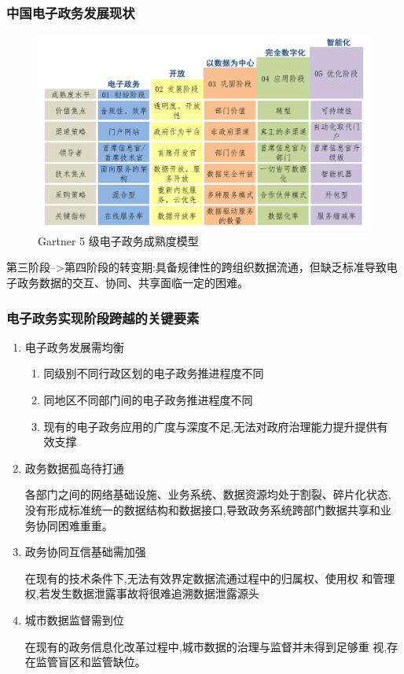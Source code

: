 \documentclass[11pt]{beamer}
\begin{document}
\begin{frame}
	\frametitle{{中国电子政务发展现状}}
	\begin{figure}
		\centering
		\includegraphics[width=0.75\linewidth]{figures/gov/3}
		\caption{Gartner 5 级电子政务成熟度模型}
		\label{fig:3}
	\end{figure}
	{\footnotesize 第三阶段-->第四阶段的转变期:具备规律性的跨组织数据流通，但缺乏标准导致电子政务数据的交互、协同、共享面临一定的困难。}
\end{frame}

\begin{frame}
	\frametitle{{电子政务实现阶段跨越的关键要素}}
	\begin{enumerate}
		\item 电子政务发展需均衡
		      \begin{enumerate}
			      \item 同级别不同行政区划的电子政务推进程度不同
			      \item 同地区不同部门间的电子政务推进程度不同
			      \item 现有的电子政务应用的广度与深度不足,无法对政府治理能力提升提供有
			            效支撑
		      \end{enumerate}
		\item 政务数据孤岛待打通

		      各部门之间的网络基础设施、业务系统、数据资源均处于割裂、碎片化状态,
		      没有形成标准统一的数据结构和数据接口,导致政务系统跨部门数据共享和业
		      务协同困难重重。
		\item 政务协同互信基础需加强

		      在现有的技术条件下,无法有效界定数据流通过程中的归属权、使用权
		      和管理权,若发生数据泄露事故将很难追溯数据泄露源头
		\item 城市数据监督需到位

		      在现有的政务信息化改革过程中,城市数据的治理与监督并未得到足够重
		      视,存在监管盲区和监管缺位。
	\end{enumerate}
\end{frame}
\end{document}
